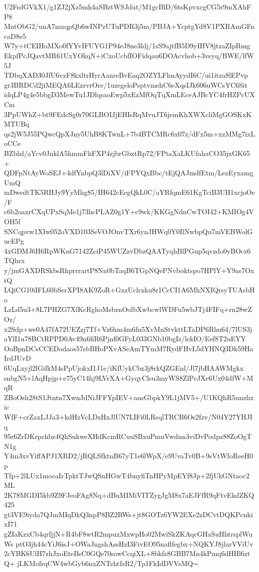 U2FsdGVkX1/g1ZJ2jXz5mh4aSBztWSJdut/M1gcBlD/6tsKpvxcgCG5r9mXAhFP8
MntObG2/unA7mxqpQb6wINPzUTuPDR3j5m/PBJA+YcptgYd8V1PXRAmGFncaD8e5
W7y+tCEIHoMXo0fYYvIFUYG1P94eJ8ne3ldj/1sS9ajtfB5D9yIHV8jtzaZIpRmg
EkpfPcJQavtMR61UxYOkqN+iCxoUcbfIOFidqau6DOAcvhob+3veyq/BWE/lfW5J
TDbqXAD30JfU6vzF8kxltrHyrAanreBvEaq2OZYLFhnAyydI6C/ui1itza8lEPvp
gr3BRDCd2jiMEQA6LEzrvrOre/1uzegeloPsptvmehC6eXqsIJk606uWCsYC6Sit
idqLP4g4e5bbgD3MewTu1JDlqsaoEwp5xEzMfOqTqXmLEceAJBcYC4frHZPcUXCm
3PpUWhZ+bt9FEdcSg0r70GLBOIJjEHIsRqMvuJT6jemKhXWXcliMgGOSKxKMTUBq
qs2jW5J55PQwcQpXJny5UhB8KTwnL+7b4BTCMRc6x07z/dFx5m+xzMMg7ixLoCCe
BZblzl/aYcv0JnklA5hmmFhFXP4zjbrGbxtRp72/FPtaXaLKUfahaCO35jxGK65+
QDFpNtAyWoSEJ+4dfYnbpQ3lDiXV/iFPYQxBbc/tEjQAJmdfEtm/LezEyxamgUmQ
mDwedtTK5RHJy9YyMhg85/IH642cEegQkL0C/aYRfqmE61KgTciB3UH1xcjoOe/F
c6b2oaxrCXqUPxSqMe1j73hcPLAZ0g1Y+c9wk/KKGgNdnCwTOI42+KMIOg4VOH5f
SNCqpvw1XIw052oVXD103SeVOJOnvTXr6ynJHWq0Y0IlNwbpQu7mVEBWolGucEPg
4xGDMJ6H6RpWKnG7142ZciP45WUZzvDbzQAATyqhBlPGup5qvzdo0yBOcz6TQhrx
y/jmGAXDRSkbsRhprrrartP8Nn0bTaqB6TGpNQePNvboktspo7HPlY+Y9as7OxtQ
LQiCG10iIFL60bSerXPI8AK9ZoR+GxzUclrxku8r1CcCI1A6MhNXIQrsyTUAsbHo
LzLd5u3+8L7PHZG7XlKcRghoMsbznOolbXwbcwlWDFu5wbJTj4FIFq+rn28wZOz/
x2Sdp+we0A47fA72UEZzj7Tf+Vz6hm4m6fn5XvMnStvkttLTaDP6Rhu64/7lUS3j
aYlI1u78BCtRPPD0Av49n6fiR6Pjnf0GFyL033GNb10bgIz/lckIO/Eef8T2uEYY
OoBpnDCsCCEDodaos57sbBHoPXvASeAmTYmM7RydFHvL5dYHNQ3Dk59HaIrdJUvD
6UqLxyjl2lGifkM4sPpUjokxI1J1e/iKfUykCbx3j8rkQZGEnl/Jl7jbHAAWMgkx
snbgN5+lAqHpjp+e75yC14hj9LVrXA+GyqyClsu3myWS8ZlPcJXe6Ux04dfW+MqR
ZBoOsh28tS1Jtntn7XwnJdNiJFFYpIEV+ansGbpkY9L1jMV5+/U1KQhR5unzhxic
WfF+crZaxLJJa3+kdHzVcLDzHxJlUN7LIFi0LRsqlTRCB6Os2fzv/N04Y27YHJIq
95r6ZrDKrpchbz4QhSukweXHdKcmRCuuSBxuPmuVwdnn3viDvPodpz88ZoOgTN1g
Y4m3xvYiffAPJ1XRD2/jRQLSfktnB67yT1e6lWpX/e9UvaTv0B+9sVtWfoReeH0p
Tfp+2lLUx1mocaIrTpktTJwQSnHGwT4bnyfiTnHPyMpEYf8Jp+2fjUkGNtaoc2ML
2K78MGDI5kb9Z9FJeoFAg8Nq+dBuMIMiVITZygJgM8x7aEJFfR9qFtvEkdZKQ425
gt3VE9iyda7QJmMIqDkQ3npP8BZ2RWs+jt8GOTz6YW2EXe2zDCvtDQKPcnkixI71
gZIaKzxCb4qrfjjN+R4bF8wtR2mpuxMxwpHo02MwiSkZKAqcGHaSuHhtrsplWuWs
ptO3jh44cYiJ6isJ+OWaJngshAssHzI3FivEO95naflfegbx+NQKYJ8jlarVViUv
2cYBK6UlH7zhJxoEteBsC0GQe70sowCcqiXL+8bkfz8GBB7Mn4kPmq6dHHl6ztQ+
jLKMofrqCW4wbGyb6nxZNTzhtfzR2/Tp1FkIdDVVsMQ=
